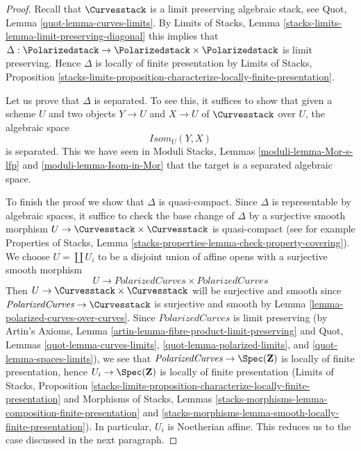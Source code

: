 \begin{proof}
Recall that $\Curvesstack$ is a limit preserving algebraic stack, see
Quot, Lemma \ref{quot-lemma-curves-limits}.
By Limits of Stacks, Lemma \ref{stacks-limits-lemma-limit-preserving-diagonal}
this implies that
$\Delta : \Polarizedstack \to \Polarizedstack \times \Polarizedstack$
is limit preserving. Hence $\Delta$ is locally of finite presentation
by Limits of Stacks, Proposition
\ref{stacks-limits-proposition-characterize-locally-finite-presentation}.

\medskip\noindent
Let us prove that $\Delta$ is separated. To see this, it suffices to show
that given a scheme $U$ and two objects $Y \to U$ and $X \to U$ of
$\Curvesstack$ over $U$, the algebraic space
$$
\mathit{Isom}_U(Y, X)
$$
is separated. This we have seen in
Moduli Stacks, Lemmas \ref{moduli-lemma-Mor-s-lfp} and
\ref{moduli-lemma-Isom-in-Mor} that the target is
a separated algebraic space.

\medskip\noindent
To finish the proof we show that $\Delta$ is quasi-compact. Since
$\Delta$ is representable by algebraic spaces, it suffice to check
the base change of $\Delta$ by a surjective smooth morphism
$U \to \Curvesstack \times \Curvesstack$ is quasi-compact
(see for example Properties of Stacks, Lemma
\ref{stacks-properties-lemma-check-property-covering}).
We choose $U = \coprod U_i$ to be a disjoint union of affine opens
with a surjective smooth morphism
$$
U \longrightarrow
\textit{PolarizedCurves} \times \textit{PolarizedCurves}
$$
Then $U \to \Curvesstack \times \Curvesstack$ will be surjective
and smooth since $\textit{PolarizedCurves} \to \Curvesstack$
is surjective and smooth by Lemma \ref{lemma-polarized-curves-over-curves}.
Since $\textit{PolarizedCurves}$ is limit preserving
(by Artin's Axioms, Lemma \ref{artin-lemma-fibre-product-limit-preserving}
and Quot, Lemmas \ref{quot-lemma-curves-limits},
\ref{quot-lemma-polarized-limits}, and
\ref{quot-lemma-spaces-limits}), we
see that $\textit{PolarizedCurves} \to \Spec(\mathbf{Z})$ is locally of
finite presentation, hence $U_i \to \Spec(\mathbf{Z})$ is
locally of finite presentation
(Limits of Stacks, Proposition
\ref{stacks-limits-proposition-characterize-locally-finite-presentation}
and Morphisms of Stacks, Lemmas
\ref{stacks-morphisms-lemma-composition-finite-presentation} and
\ref{stacks-morphisms-lemma-smooth-locally-finite-presentation}).
In particular, $U_i$ is Noetherian affine. This reduces us to the
case discussed in the next paragraph.


\end{proof}
